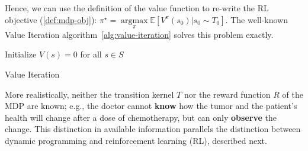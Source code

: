 Hence, we can use the definition of the value function to re-write the RL objective (\ref{def:mdp-obj}): $\pi^{\star} = \underset{\pi}{\operatorname{argmax}}\mathbb{E}\left[V^{\pi}(s_0)|s_0\sim T_0 \right]$.
The well-known Value Iteration algorithm~\ref{alg:value-iteration} solves this problem exactly. 

\begin{algorithm}
    Initialize $V(s) = 0$ for all $s \in S$ \\
    \caption{Value Iteration}\label{alg:value-iteration}
\end{algorithm}

More realistically, neither the transition kernel $T$ nor the reward function $R$ of the MDP are known; e.g., the doctor cannot \textbf{know} how the tumor and the patient's health will change after a dose of chemotherapy, but can only \textbf{observe} the change.
This distinction in available information parallels the distinction between dynamic programming and reinforcement learning (RL), described next. 

